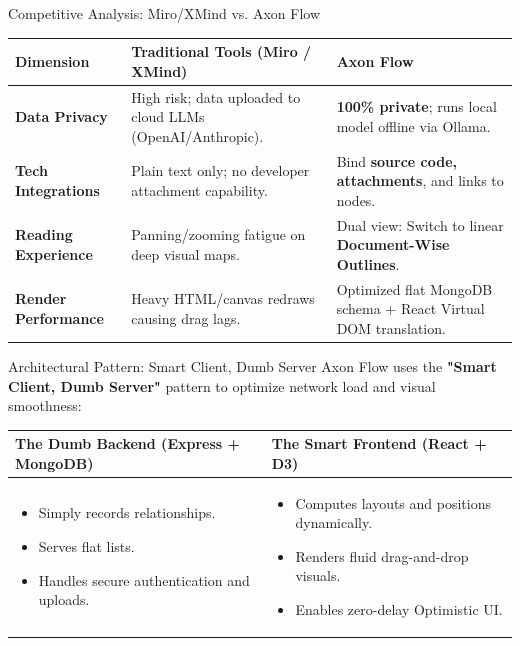 \documentclass[aspectratio=169, 10pt]{beamer}
\begin{document}
\begin{frame}{Competitive Analysis: Miro/XMind vs. Axon Flow}
  \centering
  \begin{tabularx}{\textwidth}{lXX}
    \toprule
    \textbf{Dimension} & \textbf{Traditional Tools (Miro / XMind)} & \textbf{Axon Flow} \\
    \midrule
    \textbf{Data Privacy} & High risk; data uploaded to cloud LLMs (OpenAI/Anthropic). & \textbf{100\% private}; runs local model offline via Ollama. \\
    \midrule
    \textbf{Tech Integrations} & Plain text only; no developer attachment capability. & Bind \textbf{source code, attachments}, and links to nodes. \\
    \midrule
    \textbf{Reading Experience} & Panning/zooming fatigue on deep visual maps. & Dual view: Switch to linear \textbf{Document-Wise Outlines}. \\
    \midrule
    \textbf{Render Performance} & Heavy HTML/canvas redraws causing drag lags. & Optimized flat MongoDB schema + React Virtual DOM translation. \\
    \bottomrule
  \end{tabularx}
\end{frame}

\begin{frame}{Architectural Pattern: Smart Client, Dumb Server}
  Axon Flow uses the \textbf{"Smart Client, Dumb Server"} pattern to optimize network load and visual smoothness:
  \vspace{0.8em}
  \begin{table}
    \centering
    \begin{tabular}{p{} p{}}
      \toprule
      \textbf{The Dumb Backend (Express + MongoDB)} & \textbf{The Smart Frontend (React + D3)} \\
      \midrule
      \begin{itemize}
        \item Simply records relationships.
        \item Serves flat lists.
        \item Handles secure authentication and uploads.
      \end{itemize}
      &
      \begin{itemize}
        \item Computes layouts and positions dynamically.
        \item Renders fluid drag-and-drop visuals.
        \item Enables zero-delay Optimistic UI.
      \end{itemize}
      \\ \bottomrule
    \end{tabular}
  \end{table}
\end{frame}
\end{document}

